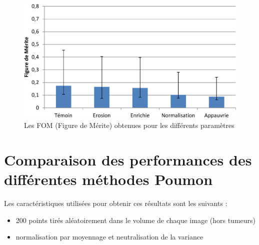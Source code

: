 \begin{figure}[h!]
 \begin{center}
   \includegraphics[width=15cm]{images/FOM_param}
 \end{center}
 \caption{ \label{lab:fom_param} Les FOM (Figure de Mérite) obtenues pour les différents paramètres}
\end{figure}

\FloatBarrier

\section{Comparaison des performances des différentes méthodes Poumon}

Les caractéristiques utilisées pour obtenir ces résultats sont les suivants :

\begin{itemize}
 \item 200 points tirés aléatoirement dans le volume de chaque image (hors tumeurs)
 \item normalisation par moyennage et neutralisation de la variance 
\end{itemize}


